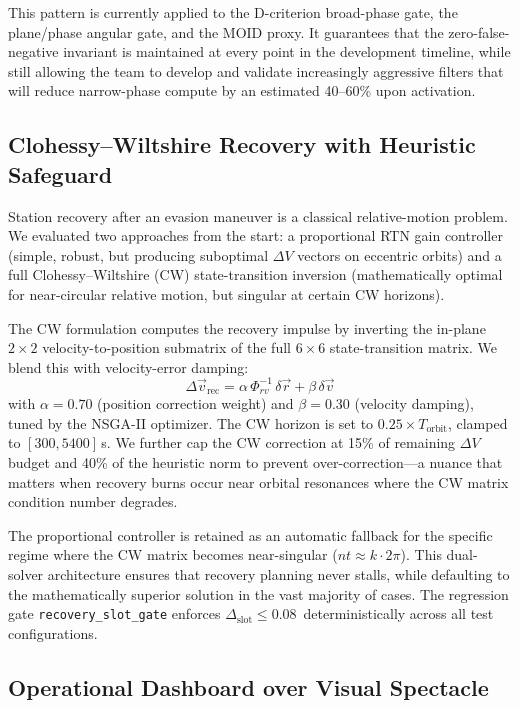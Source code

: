 \documentclass[10pt,twocolumn,letterpaper]{article}
\begin{document}
This pattern is currently applied to the D-criterion broad-phase gate,
the plane/phase angular gate, and the MOID proxy.  It guarantees that the
zero-false-negative invariant is maintained at every point in the
development timeline, while still allowing the team to develop and
validate increasingly aggressive filters that will reduce narrow-phase
compute by an estimated 40--60\% upon activation.

\subsection{Clohessy--Wiltshire Recovery with Heuristic Safeguard}

Station recovery after an evasion maneuver is a classical relative-motion
problem.  We evaluated two approaches from the start: a proportional RTN
gain controller (simple, robust, but producing suboptimal $\Delta V$
vectors on eccentric orbits) and a full Clohessy--Wiltshire (CW)
state-transition inversion (mathematically optimal for near-circular
relative motion, but singular at certain CW horizons).

The CW formulation computes the recovery impulse by inverting the
in-plane $2 \times 2$ velocity-to-position submatrix of the full
$6 \times 6$ state-transition matrix.  We blend this
with velocity-error damping:
%
\begin{equation}
  \Delta\vec{v}_{\text{rec}} = \alpha\,\Phi_{rv}^{-1}\,\delta\vec{r}
    + \beta\,\delta\vec{v}
\end{equation}
%
with $\alpha = 0.70$ (position correction weight) and
$\beta = 0.30$ (velocity damping), tuned by the NSGA-II optimizer.  The
CW horizon is set to $0.25 \times T_{\text{orbit}}$, clamped to
$[300, 5400]$\,s.  We further cap the CW correction at 15\% of remaining
$\Delta V$ budget and 40\% of the heuristic norm to prevent
over-correction---a nuance that matters when recovery burns occur near
orbital resonances where the CW matrix condition number degrades.

The proportional controller is retained as an automatic fallback for the
specific regime where the CW matrix becomes near-singular ($nt \approx
k \cdot 2\pi$).  This dual-solver architecture ensures that recovery
planning never stalls, while defaulting to the mathematically superior
solution in the vast majority of cases.  The regression gate
\texttt{recovery\_slot\_gate} enforces
$\Delta_{\text{slot}} \leq 0.08$~deterministically across all test
configurations.

\subsection{Operational Dashboard over Visual Spectacle}
\end{document}
